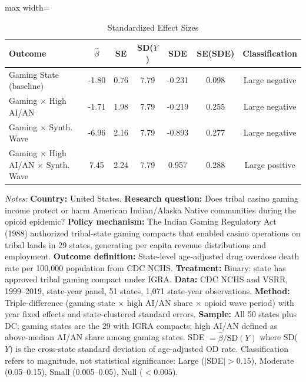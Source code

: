 \begin{table}[htbp]
\centering
\caption{Standardized Effect Sizes}
\label{tab:sde}
\begin{adjustbox}{max width=\textwidth}
\begin{tabular}{lcccccc}
\hline\hline
Outcome & $\hat{\beta}$ & SE & SD($Y$) & SDE & SE(SDE) & Classification \\
\hline
Gaming State (baseline)  &  -1.80  &  0.76  &  7.79  &  -0.231  &  0.098  &  Large negative  \\
Gaming $\times$ High AI/AN  &  -1.71  &  1.98  &  7.79  &  -0.219  &  0.255  &  Large negative  \\
Gaming $\times$ Synth. Wave  &  -6.96  &  2.16  &  7.79  &  -0.893  &  0.277  &  Large negative  \\
Gaming $\times$ High AI/AN $\times$ Synth. Wave  &  7.45  &  2.24  &  7.79  &  0.957  &  0.288  &  Large positive  \\
\hline\hline
\end{tabular}
\end{adjustbox}
\begin{tablenotes}[flushleft]\footnotesize
\item \textit{Notes:} \textbf{Country:} United States. \textbf{Research question:} Does tribal casino gaming income protect or harm American Indian/Alaska Native communities during the opioid epidemic? \textbf{Policy mechanism:} The Indian Gaming Regulatory Act (1988) authorized tribal-state gaming compacts that enabled casino operations on tribal lands in 29 states, generating per capita revenue distributions and employment. \textbf{Outcome definition:} State-level age-adjusted drug overdose death rate per 100,000 population from CDC NCHS. \textbf{Treatment:} Binary: state has approved tribal gaming compact under IGRA. \textbf{Data:} CDC NCHS and VSRR, 1999--2019, state-year panel, 51 states, 1,071 state-year observations. \textbf{Method:} Triple-difference (gaming state $\times$ high AI/AN share $\times$ opioid wave period) with year fixed effects and state-clustered standard errors. \textbf{Sample:} All 50 states plus DC; gaming states are the 29 with IGRA compacts; high AI/AN defined as above-median AI/AN share among gaming states. SDE $= \hat{\beta} / \text{SD}(Y)$ where SD($Y$) is the cross-state standard deviation of age-adjusted OD rate. Classification refers to magnitude, not statistical significance: Large ($|$SDE$| > 0.15$), Moderate (0.05--0.15), Small (0.005--0.05), Null ($< 0.005$). 
\end{tablenotes}
\end{table}
